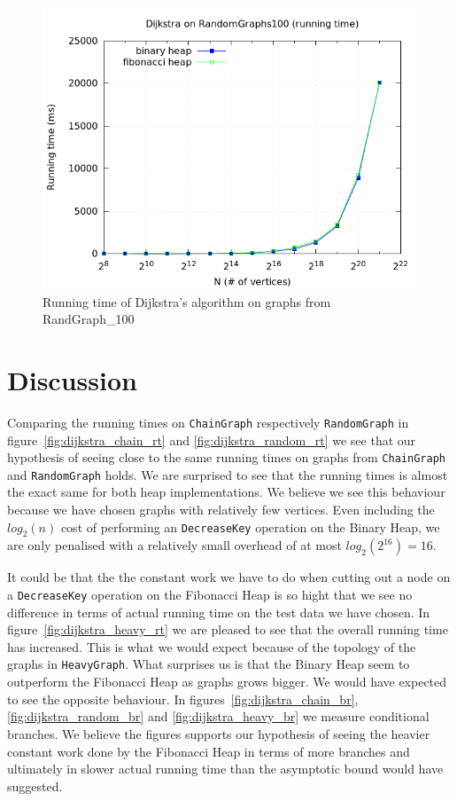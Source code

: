 \documentclass[a4paper,oneside,article,11pt]{memoir}
\begin{document}
\begin{figure}[H]
\centering
  \includegraphics[scale=0.5]{../res/dijkstra/d_rand_100_rt.png}%
  \caption{Running time of Dijkstra's algorithm on graphs from RandGraph\_100}
  \label{fig:dijkstra_rt_randomgraph100}
\end{figure}

\section{Discussion}
Comparing the running times on \texttt{ChainGraph} respectively \texttt{RandomGraph} in figure~\ref{fig:dijkstra_chain_rt} and \ref{fig:dijkstra_random_rt} we see that our hypothesis of seeing close to the same running times on graphs from \texttt{ChainGraph} and \texttt{RandomGraph} holds. We are surprised to see that the running times is almost the exact same for both heap implementations. We believe we see this behaviour because we have chosen graphs with relatively few vertices. Even including the $log_2(n)$ cost of performing an \texttt{DecreaseKey} operation on the Binary Heap, we are only penalised with a relatively small overhead of at most $log_2(2^{16}) = 16$.


It could be that the the constant work we have to do when cutting out a node on a \texttt{DecreaseKey} operation on the Fibonacci Heap is so hight that we see no difference in terms of actual running time on the test data we have chosen. In figure~\ref{fig:dijkstra_heavy_rt} we are pleased to see that the overall running time has increased. This is what we would expect because of the topology of the graphs in \texttt{HeavyGraph}. What surprises us is that the Binary Heap seem to outperform the Fibonacci Heap as graphs grows bigger. We would have expected to see the opposite behaviour. In figures~\ref{fig:dijkstra_chain_br}, \ref{fig:dijkstra_random_br} and \ref{fig:dijkstra_heavy_br} we measure conditional branches. We believe the figures supports our hypothesis of seeing the heavier constant work done by the Fibonacci Heap in terms of more branches and ultimately in slower actual running time than the asymptotic bound would have suggested.
\end{document}
